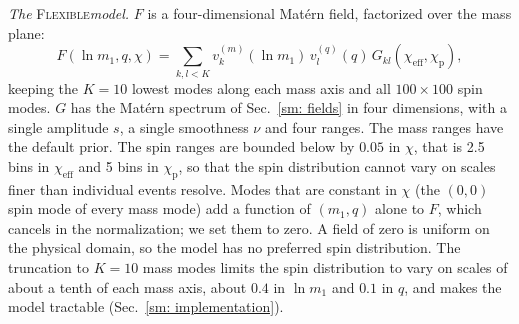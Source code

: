 \documentclass[%
 reprint,
 amsmath,amssymb,
 aps,
 prl,
 nofootinbib,nobibnotes,
 floatfix,
]{revtex4-2}
\newcommand{\chieff}{\ensuremath{\chi_{\mathrm{eff}}}}
\newcommand{\chip}{\ensuremath{\chi_{\mathrm{p}}}}
\newcommand{\flexiblespins}{\textsc{Flexible}\xspace}
\begin{document}
\textit{The} \flexiblespins \textit{model.} $F$ is a four-dimensional Mat\'ern field, factorized over the mass plane:
\begin{equation}
    F(\ln m_1, q, \chi) = \sum_{k, l < K} v^{(m)}_k(\ln m_1)\, v^{(q)}_l(q)\, G_{kl}(\chieff, \chip),
\end{equation}
keeping the $K = 10$ lowest modes along each mass axis and all $100 \times 100$ spin modes. $G$ has the Mat\'ern spectrum of Sec.~\ref{sm: fields} in four dimensions, with a single amplitude $s$, a single smoothness $\nu$ and four ranges. The mass ranges have the default prior. The spin ranges are bounded below by $0.05$ in $\chi$, that is 2.5 bins in $\chieff$ and 5 bins in $\chip$, so that the spin distribution cannot vary on scales finer than individual events resolve. Modes that are constant in $\chi$ (the $(0, 0)$ spin mode of every mass mode) add a function of $(m_1, q)$ alone to $F$, which cancels in the normalization; we set them to zero. A field of zero is uniform on the physical domain, so the model has no preferred spin distribution. The truncation to $K = 10$ mass modes limits the spin distribution to vary on scales of about a tenth of each mass axis, about $0.4$ in $\ln m_1$ and $0.1$ in $q$, and makes the model tractable (Sec.~\ref{sm: implementation}).
\end{document}
